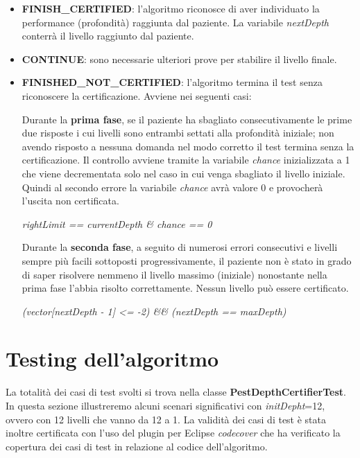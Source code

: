 \documentclass[
	corpo=12pt,
	twoside,
 	evenboxes,
	tipotesi=triennale,
    	stile=classica,
   	 greek,
]{toptesi}
\begin{document}
\begin{itemize}
\item \textbf{FINISH\_CERTIFIED}: l'algoritmo riconosce di aver individuato la performance (profondità) raggiunta dal paziente. La variabile \textit{nextDepth} conterrà il livello raggiunto dal paziente.

\item \textbf{CONTINUE}: sono necessarie ulteriori prove per stabilire il livello finale.

\item \textbf{FINISHED\_NOT\_CERTIFIED}: l'algoritmo termina il test senza riconoscere la certificazione. Avviene nei seguenti casi:

Durante la \textbf{prima fase}, se il paziente ha sbagliato consecutivamente le prime due risposte i cui livelli sono entrambi settati alla profondità iniziale; non avendo risposto a nessuna domanda nel modo corretto il test termina senza la certificazione. Il controllo avviene tramite la variabile \textit{chance} inizializzata a 1 che viene decrementata solo nel caso in cui venga sbagliato il livello iniziale. Quindi al secondo errore la variabile \textit{chance} avrà valore 0 e provocherà l'uscita non certificata.

\textit{rightLimit == currentDepth \& chance == 0}

Durante la \textbf{seconda fase}, a seguito di numerosi errori consecutivi e livelli sempre più facili sottoposti progressivamente, il paziente non è stato in grado di saper risolvere nemmeno il livello massimo (iniziale) nonostante nella prima fase l'abbia risolto correttamente. Nessun livello può essere certificato.

\textit{(vector[nextDepth - 1] <= -2) \&\& (nextDepth == maxDepth)}

\end{itemize}

\newpage

\section{Testing dell'algoritmo}
\label{sec:testingdellalgoritmo}
La totalità dei casi di test svolti si trova nella classe \textbf{PestDepthCertifierTest}. In questa sezione illustreremo alcuni scenari significativi con \textit{initDepht}=12, ovvero con 12 livelli che vanno da 12 a 1.
La validità dei casi di test è stata inoltre certificata con l'uso del plugin per Eclipse \textit{codecover} \cite{codecover} che ha verificato la copertura dei casi di test in relazione al codice dell'algoritmo.
\end{document}
